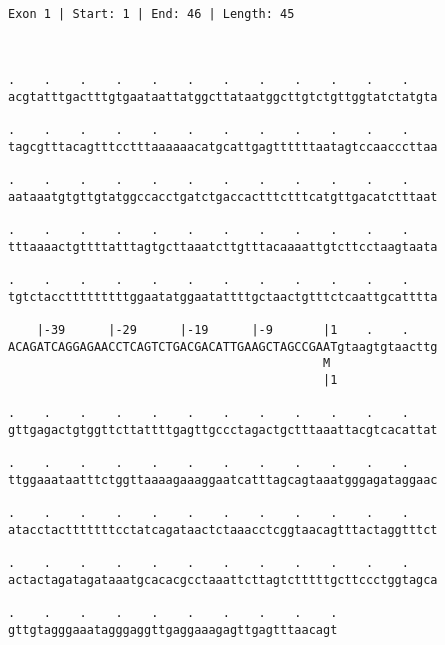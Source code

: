 \documentclass{article}
\begin{document}
 \begin{Verbatim}
 
Exon 1 | Start: 1 | End: 46 | Length: 45



.    .    .    .    .    .    .    .    .    .    .    .    
acgtatttgactttgtgaataattatggcttataatggcttgtctgttggtatctatgta
                                                            
.    .    .    .    .    .    .    .    .    .    .    .    
tagcgtttacagtttcctttaaaaaacatgcattgagttttttaatagtccaacccttaa
                                                            
.    .    .    .    .    .    .    .    .    .    .    .    
aataaatgtgttgtatggccacctgatctgaccactttctttcatgttgacatctttaat
                                                            
.    .    .    .    .    .    .    .    .    .    .    .    
tttaaaactgttttatttagtgcttaaatcttgtttacaaaattgtcttcctaagtaata
                                                            
.    .    .    .    .    .    .    .    .    .    .    .    
tgtctacctttttttttggaatatggaatattttgctaactgtttctcaattgcatttta
                                                            
    |-39      |-29      |-19      |-9       |1    .    .    
ACAGATCAGGAGAACCTCAGTCTGACGACATTGAAGCTAGCCGAATgtaagtgtaacttg
                                            M               
                                            |1              
  
.    .    .    .    .    .    .    .    .    .    .    .    
gttgagactgtggttcttattttgagttgccctagactgctttaaattacgtcacattat
                                                            
.    .    .    .    .    .    .    .    .    .    .    .    
ttggaaataatttctggttaaaagaaaggaatcatttagcagtaaatgggagataggaac
                                                            
.    .    .    .    .    .    .    .    .    .    .    .    
atacctactttttttcctatcagataactctaaacctcggtaacagtttactaggtttct
                                                            
.    .    .    .    .    .    .    .    .    .    .    .    
actactagatagataaatgcacacgcctaaattcttagtctttttgcttccctggtagca
                                                            
.    .    .    .    .    .    .    .    .    .
gttgtagggaaatagggaggttgaggaaagagttgagtttaacagt
                                              

\end{Verbatim}
\end{document}

